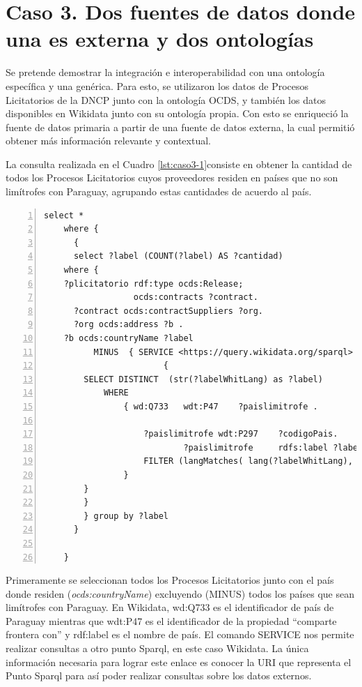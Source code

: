 \section{Caso 3. Dos fuentes de datos donde una es externa y dos ontologías}

Se pretende demostrar la integración e interoperabilidad con una ontología específica y una genérica. Para esto, se utilizaron los datos de Procesos Licitatorios de la DNCP junto con la ontología OCDS, y también los datos disponibles en Wikidata junto con su ontología propia. Con esto se enriqueció la fuente de datos primaria a partir de una fuente de datos externa, la cual permitió obtener más información relevante y contextual.

La consulta realizada en el Cuadro  \ref{lst:caso3-1}consiste en obtener la cantidad de todos los Procesos Licitatorios cuyos proveedores residen en países que no son limítrofes con Paraguay, agrupando estas cantidades de acuerdo al país.

\noindent\begin{minipage}[c]{\textwidth}
\begin{lstlisting}[captionpos=b, caption=Integracion con una fuente de datos externa utilizando dos ontologias, label=lst:caso3-1,  numbers=left,  numberstyle=\tiny\color{mygray},
    basicstyle=\footnotesize\ttfamily,frame=single]
select *
    where {
      {
      select ?label (COUNT(?label) AS ?cantidad)
    where {
    ?plicitatorio rdf:type ocds:Release;
                  ocds:contracts ?contract.
      ?contract ocds:contractSuppliers ?org.
      ?org ocds:address ?b .
    ?b ocds:countryName ?label
          MINUS  { SERVICE <https://query.wikidata.org/sparql>
                        { 
        SELECT DISTINCT  (str(?labelWhitLang) as ?label)
            WHERE
                { wd:Q733   wdt:P47    ?paislimitrofe .
                
                    ?paislimitrofe wdt:P297    ?codigoPais.
                            ?paislimitrofe     rdfs:label ?labelWhitLang. 
                    FILTER (langMatches( lang(?labelWhitLang), "ES" ) )
                }        
        }
        }
        } group by ?label
      }
    
    }
 \end{lstlisting}
\end{minipage}

Primeramente se seleccionan todos los Procesos Licitatorios junto con el país donde residen (\textit{ocds:countryName}) excluyendo (MINUS) todos los países que sean limítrofes con Paraguay. En Wikidata, wd:Q733 es el identificador de país de Paraguay mientras que wdt:P47 es el identificador de la propiedad “comparte frontera con” y rdf:label es el nombre de país. El comando SERVICE nos permite realizar consultas a otro punto Sparql, en este caso Wikidata. La única información necesaria para lograr este enlace es conocer la URI que representa el Punto Sparql para así poder realizar consultas sobre los datos externos.


